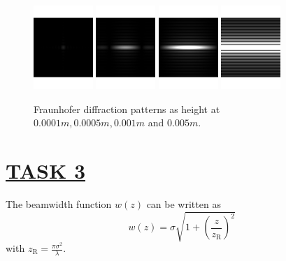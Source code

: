 \documentclass[fontsize=11pt]{scrartcl}
\begin{document}
\begin{figure}[H]
    \centering
     \includegraphics[width=0.20\textwidth]{img/2_0.bmp.pdf}
     \includegraphics[width=0.20\textwidth]{img/2_1.bmp.pdf}
     \includegraphics[width=0.20\textwidth]{img/2_2.bmp.pdf}
     \includegraphics[width=0.20\textwidth]{img/2_3.bmp.pdf}
     \caption{Fraunhofer diffraction patterns as height at $0.0001m, 0.0005m, 0.001m$ and $0.005m$.}
     \label{fig2.1}
\end{figure}

\pagebreak
\section{\uline{TASK 3}}
The beamwidth function $w(z)$ can be written as
\begin{equation}
    w(z)=\sigma \sqrt{1+\left(\frac{z}{z_{\mathrm{R}}}\right)^{2}}
    \label{w}
\end{equation}
with $z_{\mathrm{R}}=\frac{\pi \sigma ^{2}}{\lambda}$.
\end{document}
